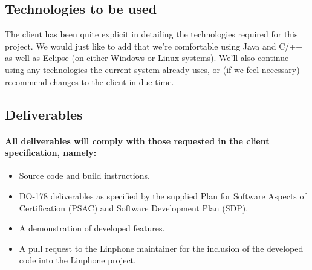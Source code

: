 \documentclass[12pt]{article}
\begin{document}
\subsection{Technologies to be used}
\par{The client has been quite explicit in detailing the technologies required for this project. We would just like to add that we're comfortable using Java and C/++ as well as Eclipse (on either Windows or Linux systems). We'll also continue using any technologies the current system already uses, or (if we feel necessary) recommend changes to the client in due time.}

\subsection{Deliverables}
\paragraph{All deliverables will comply with those requested in the client specification, namely:}
\begin{itemize}
\item Source code and build instructions.
\item DO-178 deliverables as specified by the supplied Plan for Software Aspects of Certification (PSAC) and Software Development Plan (SDP).
\item A demonstration of developed features.
\item A pull request to the Linphone maintainer for the inclusion of the developed code into the Linphone project.
\end{itemize}
 
\end{document}

